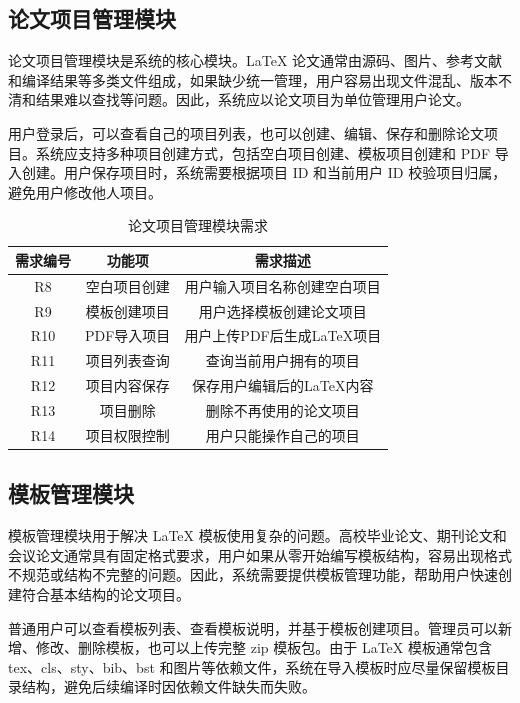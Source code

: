 \documentclass{xduugthesis}
\begin{document}
\subsection{论文项目管理模块}
论文项目管理模块是系统的核心模块。LaTeX 论文通常由源码、图片、参考文献和编译结果等多类文件组成，如果缺少统一管理，用户容易出现文件混乱、版本不清和结果难以查找等问题。因此，系统应以论文项目为单位管理用户论文。

用户登录后，可以查看自己的项目列表，也可以创建、编辑、保存和删除论文项目。系统应支持多种项目创建方式，包括空白项目创建、模板项目创建和 PDF 导入创建。用户保存项目时，系统需要根据项目 ID 和当前用户 ID 校验项目归属，避免用户修改他人项目。

\begin{table}[!ht]
    \centering
    \caption{论文项目管理模块需求}
    \label{tab:project-requirement}
    \begin{tabular}{|c|c|c|}
        \hline
        需求编号 & 功能项 & 需求描述 \\
        \hline
        R8 & 空白项目创建 & 用户输入项目名称创建空白项目 \\
        \hline
        R9 & 模板创建项目 & 用户选择模板创建论文项目 \\
        \hline
        R10 & PDF导入项目 & 用户上传PDF后生成LaTeX项目 \\
        \hline
        R11 & 项目列表查询 & 查询当前用户拥有的项目 \\
        \hline
        R12 & 项目内容保存 & 保存用户编辑后的LaTeX内容 \\
        \hline
        R13 & 项目删除 & 删除不再使用的论文项目 \\
        \hline
        R14 & 项目权限控制 & 用户只能操作自己的项目 \\
        \hline
    \end{tabular}
\end{table}

\subsection{模板管理模块}
模板管理模块用于解决 LaTeX 模板使用复杂的问题。高校毕业论文、期刊论文和会议论文通常具有固定格式要求，用户如果从零开始编写模板结构，容易出现格式不规范或结构不完整的问题。因此，系统需要提供模板管理功能，帮助用户快速创建符合基本结构的论文项目。

普通用户可以查看模板列表、查看模板说明，并基于模板创建项目。管理员可以新增、修改、删除模板，也可以上传完整 zip 模板包。由于 LaTeX 模板通常包含 tex、cls、sty、bib、bst 和图片等依赖文件，系统在导入模板时应尽量保留模板目录结构，避免后续编译时因依赖文件缺失而失败。
\end{document}
